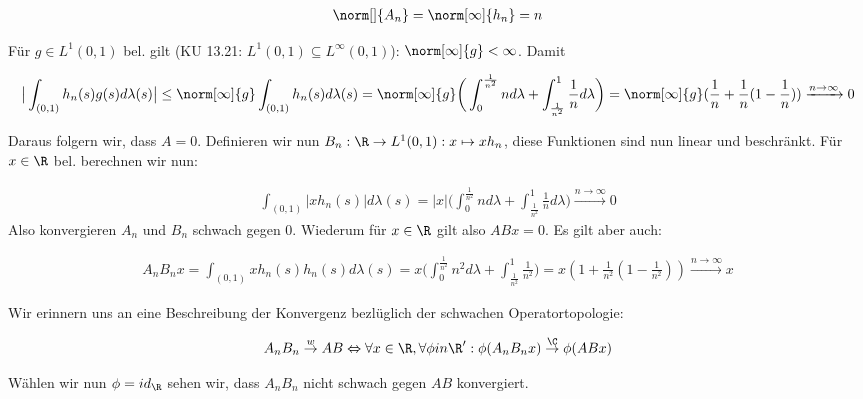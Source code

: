\begin{solution}
\begin{align*}
  \norm[]{A_n} = \norm[\infty]{h_n} = n
\end{align*}

Für $g \in L^1(0,1)$ bel. gilt (KU 13.21: $L^1(0,1) \subseteq L^{\infty}(0,1)$):
$\norm[\infty]{g} < \infty$. Damit

\begin{align*}
  \big| \int_{(0,1)}h_n(s) g(s)d\lambda(s) \big|
  \leq \norm[\infty]{g} \int_{(0,1)} h_n(s) d\lambda(s)
  =\norm[\infty]{g}
  \bigg( \int_0^\frac{1}{n^2} n d\lambda + \int_\frac{1}{n^2}^1 \frac{1}{n} d\lambda
  \bigg)
  = \norm[\infty]{g} (\frac{1}{n}+\frac{1}{n}(1-\frac{1}{n}))
  \xrightarrow{n \rightarrow \infty} 0
\end{align*}

Daraus folgern wir, dass $A=0$. Definieren wir nun
$B_n: \R \rightarrow L^1(0,1): x \mapsto xh_n$, diese Funktionen sind nun linear und
beschränkt. Für $x \in \R$ bel. berechnen wir nun:

\begin{align*}
  \int_{(0,1)} |xh_n(s)|d\lambda(s) = |x|
  \bigg( \int_0^\frac{1}{n^2} n d\lambda + \int_\frac{1}{n^2}^1 \frac{1}{n} d\lambda
  \bigg)
  \xrightarrow{n \rightarrow \infty} 0
\end{align*}
Also konvergieren $A_n$ und $B_n$ schwach gegen 0. Wiederum für $x \in \R$ gilt also
$ABx = 0$. Es gilt aber auch:

\begin{align*}
  A_n B_n x =
  \int_{(0,1)} x h_n(s) h_n(s) d\lambda(s) = x
  \bigg(\int_0^\frac{1}{n^2} n^2 d\lambda + \int_\frac{1}{n^2}^1 \frac{1}{n^2}
  \bigg)
  = x(1+\frac{1}{n^2}(1-\frac{1}{n^2}))
  \xrightarrow{n \rightarrow \infty} x
\end{align*}

Wir erinnern uns an eine Beschreibung der Konvergenz bezlüglich der schwachen Operatortopologie:

\begin{align*}
  A_n B_n \stackrel{w}{\rightarrow} AB \Leftrightarrow
  \forall x \in \R, \forall \phi in \R':
  \phi(A_n B_n x) \stackrel{\C}{\rightarrow} \phi(ABx)
\end{align*}

Wählen wir nun $\phi=id_\R$ sehen wir, dass $A_n B_n$ nicht schwach gegen $AB$ konvergiert.
\end{solution}
